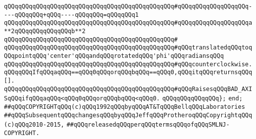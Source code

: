 \verb|qQQqqQQqqQQqqQQqqQQqqQQqqQQqqQQqqQQqqQQqqQQqqQQq#qQQqqQQqqQQqqQQqqQQq----qQQqqQQq+qQQq----qQQqqQQq=qQQqqQQq1|\newline
\verb|qQQqqQQqqQQqqQQqqQQqqQQqqQQqqQQqqQQqqQQqqQQqqQQq#qQQqqQQqqQQqqQQqqQQqa**2qQQqqQQqqQQqqQQqb**2|\newline
\verb|qQQqqQQqqQQqqQQqqQQqqQQqqQQqqQQqqQQqqQQqqQQqqQQq#|\newline
\verb|qQQqqQQqqQQqqQQqqQQqqQQqqQQqqQQqqQQqqQQqqQQqqQQq#qQQqtranslatedqQQqtoqQQqpointqQQq'center'qQQqandqQQqrotatedqQQq'phi'qQQqradiansqQQq|\newline
\verb|qQQqqQQqqQQqqQQqqQQqqQQqqQQqqQQqqQQqqQQqqQQqqQQq#qQQqcounterclockwise.qQQqqQQqIfqQQqaqQQq==qQQq0qQQqorqQQqbqQQq==qQQq0,qQQqitqQQqreturnsqQQq[].|\newline
\verb|qQQqqQQqqQQqqQQqqQQqqQQqqQQqqQQqqQQqqQQqqQQqqQQq#qQQqRaisesqQQqBAD_AXISqQQqifqQQqaqQQq<qQQq0qQQqorqQQqbqQQq<qQQq0.|\newline
\newline
\verb|qQQqqQQqqQQqqQQq};|\newline
\newline
\verb|end;|\newline
\newline
\newline
\verb|##qQQqCOPYRIGHTqQQq(c)qQQq1992qQQqbyqQQqAT&TqQQqBellqQQqLaboratories|\newline
\verb|##qQQqSubsequentqQQqchangesqQQqbyqQQqJeffqQQqProtheroqQQqCopyrightqQQq(c)qQQq2010-2015,|\newline
\verb|##qQQqreleasedqQQqperqQQqtermsqQQqofqQQqSMLNJ-COPYRIGHT.|\newline

